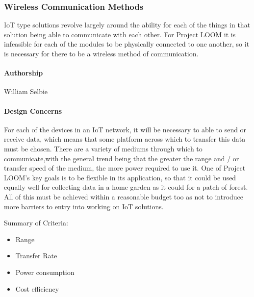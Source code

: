 \documentclass[onecolumn, draftclsnofoot,10pt, compsoc]{IEEEtran}
\begin{document}
\subsubsection{Wireless Communication Methods}
IoT type solutions revolve largely around the ability for each of the things in that solution being able to communicate with each other. For Project LOOM it is infeasible for each of the modules to be physically connected to one another, so it is necessary for there to be a wireless method of communication. 

\paragraph{Authorship}
William Selbie

\paragraph{Design Concerns}
For each of the devices in an IoT network, it will be necessary to able to send or receive data, which means that some platform across which to transfer this data must be chosen. There are a variety of mediums through which to communicate,with the general trend being that the greater the range and / or transfer speed of the medium, the more power required to use it. One of Project LOOM's key goals is to be flexible in its application, so that it could be used equally well for collecting data in a home garden as it could for a patch of forest. All of this must be achieved within a reasonable budget too as not to introduce more barriers to entry into working on IoT solutions. 

Summary of Criteria:
\begin{itemize}[noitemsep,topsep=-10pt]
    \item Range
    \item Transfer Rate
    \item Power consumption
    \item Cost efficiency
\end{itemize}
\end{document}
